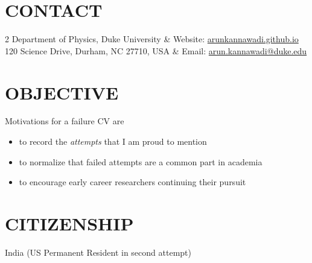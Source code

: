 \documentclass[margin, 9pt]{res} %
\begin{document}
\begin{resume}

    \section{CONTACT}
    \begin{ncolumn}{2}
        Department of Physics, Duke University &  Website: \url{arunkannawadi.github.io} \\
        120 Science Drive, Durham, NC 27710, USA & Email: \url{arun.kannawadi@duke.edu} \\
    \end{ncolumn}


\section{OBJECTIVE}
Motivations for a failure CV are
\begin{itemize}
    \item to record the \emph{attempts} that I am proud to mention
    \item to normalize that failed attempts are a common part in academia
    \item to encourage early career researchers continuing their pursuit
\end{itemize}

\section{CITIZENSHIP} India (US Permanent Resident in second attempt)



\end{resume}
\end{document}
